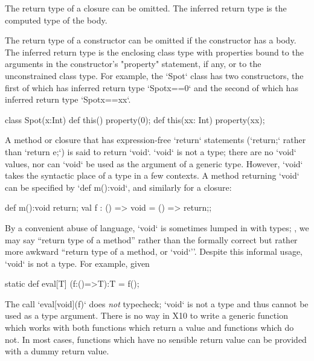 {The return type of a closure can be omitted.
The inferred return type is the computed type of the body.

The return type of a constructor can be omitted if the
constructor has a body.
The inferred return type is the enclosing class type with
properties bound to the arguments in the constructor's \xcd"property"
statement, if any, or to the unconstrained class type.
For example, the \xcd`Spot` class has two constructors, the first of which has
inferred return type \xcd`Spot{x==0}` and the second of which has 
inferred return type \xcd`Spot{x==xx}`. 
\begin{xten}
class Spot(x:Int) {
  def this() {property(0);}
  def this(xx: Int) { property(xx); }
}
\end{xten}



A method or closure that has expression-free \xcd`return` statements
(\xcd`return;` rather than \xcd`return e;`) is said to return \xcd`void`.
\xcd`void` is not a type; there are no \xcd`void` values, nor can \xcd`void`
be used as the argument of a generic type. However, \xcd`void` takes the
syntactic place of a type in a few contexts. A method returning \xcd`void` can be specified by
\xcd`def m():void`, and similarly for a closure: 

\begin{xten}
def m():void {return;}
val f : () => void = () => {return;};
\end{xten}

By a convenient abuse of language, \xcd`void` is sometimes
lumped in with types; \eg, we may say ``return type of a method'' rather than
the formally correct but rather more awkward ``return type of a method, or
\xcd`void`''.   Despite this informal usage, \xcd`void` is not a type.  For
example, given 
\begin{xten}
  static def eval[T] (f:()=>T):T = f();
\end{xten}
\noindent
The call \xcd`eval[void](f)` does {\em not} typecheck; \xcd`void` is not a
type and thus cannot be used as a type argument.  There is no way in X10 to
write a generic function which works with both functions which return a value
and functions which do not.  In most cases, functions which have no sensible
return value can be provided with a dummy return value.

}
